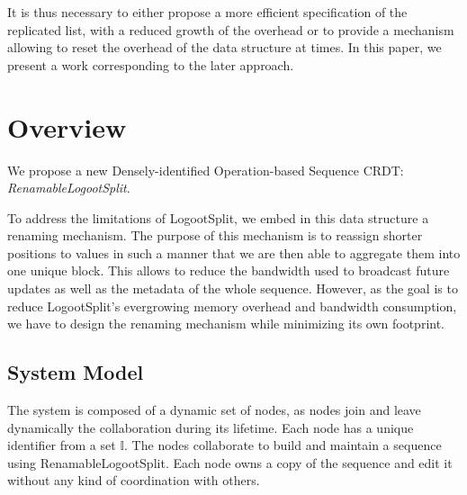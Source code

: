 \documentclass{article}
\theoremstyle{definition}
\begin{document}



It is thus necessary to either propose a more efficient specification of the replicated list, with a reduced growth of the overhead
or to provide a mechanism allowing to reset the overhead of the data structure at times.
In this paper, we present a work corresponding to the later approach.

\section{Overview}

We propose a new Densely-identified Operation-based Sequence \ac{CRDT}: \emph{RenamableLogootSplit}.

To address the limitations of LogootSplit, we embed in this data structure a renaming mechanism.
The purpose of this mechanism is to reassign shorter positions to values in such a manner that we are then able to aggregate them into one unique block.
This allows to reduce the bandwidth used to broadcast future updates as well as the metadata of the whole sequence.
However, as the goal is to reduce LogootSplit's evergrowing memory overhead and bandwidth consumption, we have to design the renaming mechanism while minimizing its own footprint.

\subsection{System Model}

The system is composed of a dynamic set of nodes, as nodes join and leave dynamically the collaboration during its lifetime.
Each node has a unique identifier from a set $\mathbb{I}$.
The nodes collaborate to build and maintain a sequence using RenamableLogootSplit.
Each node owns a copy of the sequence and edit it without any kind of coordination with others.
\end{document}
